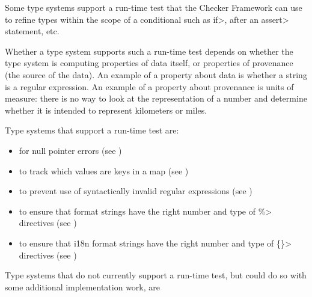 Some type systems support a run-time test that the Checker Framework can
use to refine types within the scope of a conditional such as \<if>, after
an \<assert> statement, etc.

Whether a type system supports such a run-time test depends on whether the
type system is computing properties of data itself, or properties of
provenance (the source of the data).  An example of a property about data is
whether a string is a regular expression.  An example of a property about
provenance is units of measure:  there is no way to look at the
representation of a number and determine whether it is intended to
represent kilometers or miles.


Type systems that support a run-time test are:
\begin{itemize}
\item
   for null pointer errors
  (see )
\item
   to track which values are
  keys in a map (see )
\item
   to prevent use of syntactically
  invalid regular expressions (see )
\item
   to ensure that format
  strings have the right number and type of \<\%> directives (see
  )
\item
  to ensure that i18n format strings have the right number and type of
  \<\{\}> directives (see )
\end{itemize}


Type systems that do not currently support a run-time test, but could do so with some
additional implementation work, are

